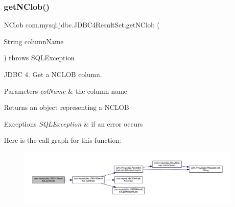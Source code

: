 \subsubsection{\texorpdfstring{get\+N\+Clob()}{getNClob()}\hspace{0.1cm}{\footnotesize\ttfamily [2/2]}}
{\footnotesize\ttfamily N\+Clob com.\+mysql.\+jdbc.\+J\+D\+B\+C4\+Result\+Set.\+get\+N\+Clob (\begin{DoxyParamCaption}\item[{String}]{column\+Name }\end{DoxyParamCaption}) throws S\+Q\+L\+Exception}

J\+D\+BC 4. Get a N\+C\+L\+OB column.


\begin{DoxyParams}{Parameters}
{\em col\+Name} & the column name\\
\hline
\end{DoxyParams}
\begin{DoxyReturn}{Returns}
an object representing a N\+C\+L\+OB
\end{DoxyReturn}

\begin{DoxyExceptions}{Exceptions}
{\em S\+Q\+L\+Exception} & if an error occurs \\
\hline
\end{DoxyExceptions}
Here is the call graph for this function\+:
\nopagebreak
\begin{figure}[H]
\begin{center}
\leavevmode
\includegraphics[width=350pt]{classcom_1_1mysql_1_1jdbc_1_1_j_d_b_c4_result_set_ab31ba6018cd42a3af784126f0d17db83_cgraph}
\end{center}
\end{figure}
\mbox{\label{classcom_1_1mysql_1_1jdbc_1_1_j_d_b_c4_result_set_ab4ab66899e61b969bab44eccedad00fb}} 
